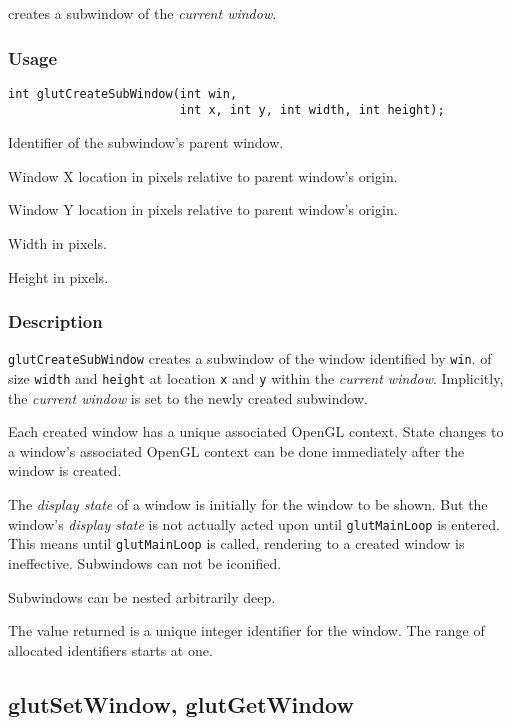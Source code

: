  creates a subwindow of the {\em current window}.

\subsubsection*{Usage}
\begin{verbatim}
int glutCreateSubWindow(int win,
                        int x, int y, int width, int height);
\end{verbatim}
\begin{description}
\itemsep 0in
\item[\tt win]
Identifier of the subwindow's parent window.
\item[\tt x]
Window X location in pixels relative to parent window's origin.
\item[\tt y]
Window Y location in pixels relative to parent window's origin.
\item[\tt width]
Width in pixels.
\item[\tt height]
Height in pixels.
\end{description}

\subsubsection*{Description}

{\tt glutCreateSubWindow} creates a subwindow of the window identified by {\tt win}.
of size {\tt width} and {\tt height} at location {\tt x} and {\tt y}
within the {\em current window}.
Implicitly, the {\em current window} is set to the newly created subwindow.

Each created window has a unique associated OpenGL context.  State changes to
a window's associated OpenGL context can be done immediately after the
window is created.

The {\em display state} of a window is initially for the window
to be shown.  But the window's {\em display state} is not actually
acted upon until {\tt glutMainLoop} is entered.  This means until {\tt glutMainLoop}
is called, rendering to a created window is ineffective.
Subwindows can not be iconified.

Subwindows can be nested arbitrarily deep.

The value returned is a unique integer identifier for the window.  The
range of allocated identifiers starts at one.

\subsection{glutSetWindow, glutGetWindow}

